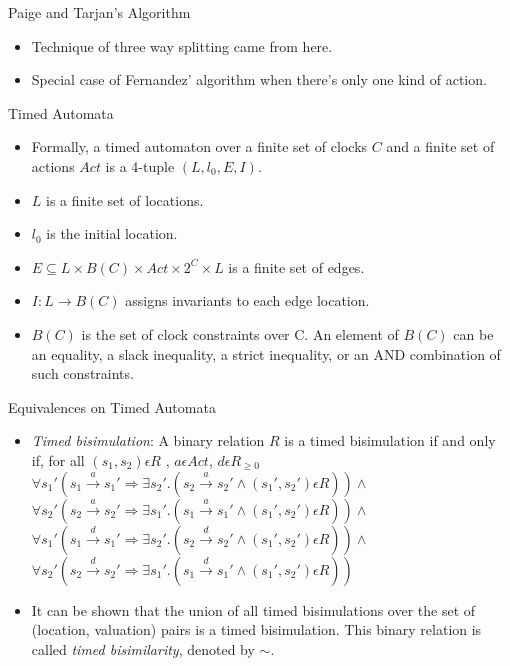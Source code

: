 \documentclass{beamer}
\begin{document}
\begin{frame}{Paige and Tarjan's Algorithm}
  \begin{itemize}
  \item Technique of three way splitting came from here.
  \item Special case of Fernandez' algorithm when there's only one
    kind of action.
  \end{itemize}
\end{frame}

\begin{frame}{Timed Automata}
  \begin{itemize}
  \item Formally, a timed automaton over a finite set of clocks $C$
    and a finite set of actions $Act$ is a 4-tuple $(L, l_{0}, E, I)$.
  \item $L$ is a finite set of locations.
  \item $l_{0}$ is the initial location.
  \item $E \subseteq L \times B(C) \times Act \times 2^{C} \times L$
    is a finite set of edges.
  \item $I: L \rightarrow B(C)$ assigns invariants to each edge
    location.
  \item $B(C)$ is the set of clock constraints over C. An element of $B(C)$
    can be an equality, a slack inequality, a strict inequality, or
    an AND combination of such constraints.
  \end{itemize}
\end{frame}

\begin{frame}{Equivalences on Timed Automata}

  \begin{itemize}
  \item \emph{Timed bisimulation}: A binary relation $R$ is a timed
    bisimulation if and only if, for all $(s_1, s_2) \epsilon R$ , $a \epsilon Act $, $d \epsilon R_{\ge 0}$\\
    $\forall s_1' (s_1 \xrightarrow{a} s_1' \Rightarrow \exists s_2'
    . (s_2 \xrightarrow{a} s_2' \wedge (s_1', s_2') \epsilon R ) )
    \wedge $ \\
    $\forall s_2' (s_2 \xrightarrow{a} s_2' \Rightarrow \exists s_1'
    . (s_1 \xrightarrow{a} s_1' \wedge (s_1', s_2') \epsilon R ) ) \wedge $ \\
    $\forall s_1' (s_1 \xrightarrow{d} s_1' \Rightarrow \exists s_2'
    . (s_2 \xrightarrow{d} s_2' \wedge (s_1', s_2') \epsilon R ) )
    \wedge $ \\
    $\forall s_2' (s_2 \xrightarrow{d} s_2' \Rightarrow \exists s_1'
    . (s_1 \xrightarrow{d} s_1' \wedge (s_1', s_2') \epsilon R ) ) $ \\
    
  \item It can be shown that the union of all timed bisimulations
    over the set of (location, valuation) pairs is a timed bisimulation. This binary
    relation is called \textit{timed bisimilarity}, denoted by $\sim$.
  \end{itemize}

\end{frame}
\end{document}
